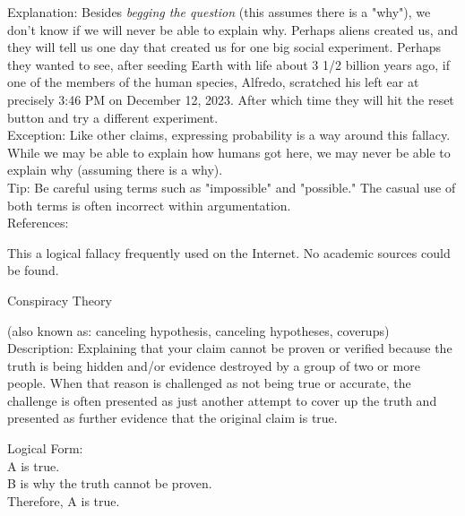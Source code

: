 \documentclass[a4paper,12pt,single,pdftex]{scrbook}
\begin{document}
    
      Explanation: Besides {\it begging the question} (this assumes there is a "why"), we don't know if we will never be able to explain why. Perhaps aliens created us, and they will tell us one day that created us for one big social experiment. Perhaps they wanted to see, after seeding Earth with life about 3 1/2 billion years ago, if one of the members of the human species, Alfredo, scratched his left ear at precisely 3:46 PM on December 12, 2023. After which time they will hit the reset button and try a different experiment.
    \\

    
      Exception: Like other claims, expressing probability is a way around this fallacy.
    \\

    
      While we may be able to explain how humans got here, we may  never be able to explain why (assuming there is a why).
    \\

    
      Tip: Be careful using terms such as "impossible" and "possible." The casual use of both terms is often incorrect within argumentation.
    \\

    References:

    
      This a logical fallacy frequently used on the Internet. No academic sources could be found.
    
  

Conspiracy Theory
    
      (also known as: canceling hypothesis, canceling hypotheses, coverups)
    \\

  
    Description: Explaining that your claim cannot be proven or verified because the truth is being hidden and/or evidence destroyed by a group of two or more people.  When that reason is challenged as not being true or accurate, the challenge is often presented as just another attempt to cover up the truth and presented as further evidence that the original claim is true.

    
      Logical Form:
    \\

    
      A is true.
    \\

    
      B is why the truth cannot be proven.
    \\

    
      Therefore, A is true.
    \\
\end{document}
